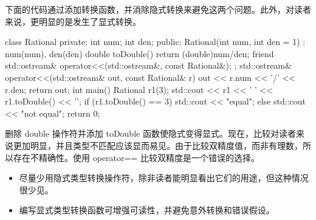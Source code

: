 下面的代码通过添加转换函数，并消除隐式转换来避免这两个问题。此外，对读者来说，更明显的是发生了显式转换。


\begin{cpp}
class Rational {
private:
  int num;
  int den;
public:
  Rational(int num, int den = 1) : num(num), den(den) {}
  double toDouble() { return (double)num/den; }
  friend std::ostream& operator<<(std::ostream&, const Rational&);
};
std::ostream& operator<<(std::ostream& out, const Rational& r) {
  out << r.num << '/' << r.den;
  return out;
}
int main() {
  Rational r1(3);
  std::cout << r1 << ' ' << r1.toDouble() << '\n';
  if (r1.toDouble() == 3)
    std::cout << "equal\n";
  else
    std::cout << "not equal\n";
  return 0;
}
\end{cpp}

删除 double 操作符并添加 toDouble 函数使隐式变得显式。现在，比较对读者来说更加明显，并且类型不匹配应该显而易见。由于比较双精度值，而非有理数，所以存在不精确性。使用 operator== 比较双精度是一个错误的选择。


\begin{itemize}
\item
尽量少用隐式类型转换操作符，除非读者能明显看出它们的用途，但这种情况很少见。

\item
编写显式类型转换函数可增强可读性，并避免意外转换和错误假设。
\end{itemize}
